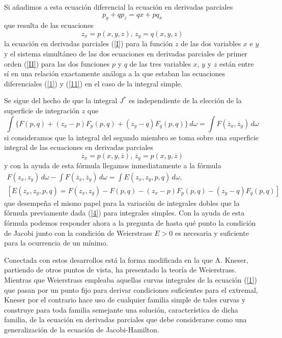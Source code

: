 \documentclass[a4paper, 12pt]{article}
\begin{document}
{Si añadimos a esta ecuación diferencial la ecuación en derivadas parciales
\begin{equation}\label{II}
p_y+qp_z=qx+pq_x
\end{equation}
que resulta de las ecuaciones
$$
z_x= p(x, y, z),\,  z_y = q(x, y, z)
$$
la ecuación en derivadas parciales (\ref{I}) para la función $z$ de las dos variables $x$ e $y$ y el sistema simultáneo de las dos ecuaciones en derivadas parciales de primer orden (\ref{II}) para las dos funciones $p$ y $q$ de las tres variables $x$, $y$ y $z$ están entre sí en una relación exactamente análoga a la que estaban las ecuaciones diferenciales (\ref{1}) y (\ref{11}) en el caso de la integral simple.

Se sigue del hecho de que la integral $J^*$ es independiente de la elección de la superficie de integración $z$ que
$$
\int\{F(p,q)+(z_x-p)F_p(p,q)+(z_y-q)F_q(p,q)\} \, d\omega = \int F(\overline{z}_x,\overline{z}_y)\, d\omega
$$
si consideramos que la integral del segundo miembro se toma sobre una superficie integral de las ecuaciones en derivadas parciales
$$
\overline{z}_x=p(x,y,\overline{z}),\, \overline{z}_y = p(x,y,\overline{z})
$$
y con la ayuda de esta fórmula llegamos inmediatamente a la fórmula
\begin{equation*}
\begin{split}
F(z_x,z_y)\, d\omega-\int F(\overline{z}_x,\overline{z}_y)\, d\omega= \int E(z_x,z_y,p,q)\, d\omega,\\ [E(z_x,z_y,p,q)=F(z_x,z_y)-F(p,q)-(z_x-p)F_p(p,q)-(z_y-q)F_q(p,q)]
\end{split}
\end{equation*}
que desempeña el mismo papel para la variación de integrales dobles que la fórmula previamente dada (\ref{4}) para integrales simples. Con la ayuda de esta fórmula podemos responder ahora a la pregunta de hasta qué punto
la condición de Jacobi junto con la condición de Weierstrass $E > 0$ es necesaria y suficiente para la ocurrencia de un mínimo.

Conectada con estos desarrollos está la forma modificada en la que A. Kneser, partiendo de otros puntos de vista, ha presentado la teoría de Weierstrass. Mientras que Weierstrass empleaba aquellas curvas integrales de la ecuación (\ref{1}) que pasan por un punto fijo para derivar condiciones suficientes para el extremal, Kneser por el contrario hace uso de cualquier familia simple de tales curvas y construye para toda familia semejante una solución, característica de dicha familia, de la ecuación en derivadas parciales que debe considerarse como una generalización de la ecuación de Jacobi-Hamilton.

}
\end{document}
